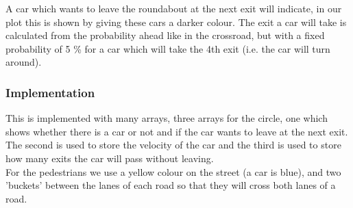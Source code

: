 A car which wants to leave the roundabout at the next exit will indicate, in our plot this is shown by giving these cars a darker colour. 
The exit a car will take is calculated from the probability ahead like in the crossroad, but with a fixed probability of 5 \% for a car which will take the 4th exit (i.e. the car will turn around). \\
\subsubsection{Implementation}
This is implemented with many arrays, three arrays for the circle, one which shows whether there is a car or not and if the car wants to leave at the next exit. 
The second is used to store the velocity of the car and the third is used to store how many exits the car will pass without leaving.\\

For the pedestrians we use a yellow colour on the street (a car is blue), and two 'buckets' between the lanes of each road so that they will cross both lanes of a road.